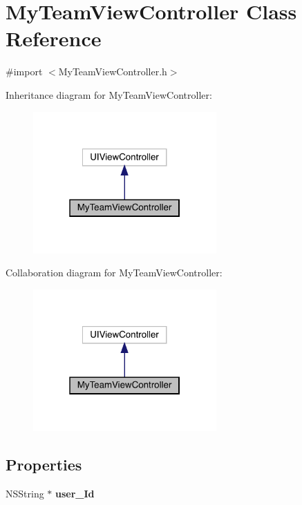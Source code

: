 \hypertarget{interface_my_team_view_controller}{}\section{My\+Team\+View\+Controller Class Reference}
\label{interface_my_team_view_controller}


{\ttfamily \#import $<$My\+Team\+View\+Controller.\+h$>$}



Inheritance diagram for My\+Team\+View\+Controller\+:\nopagebreak
\begin{figure}[H]
\begin{center}
\leavevmode
\includegraphics[width=199pt]{interface_my_team_view_controller__inherit__graph}
\end{center}
\end{figure}


Collaboration diagram for My\+Team\+View\+Controller\+:\nopagebreak
\begin{figure}[H]
\begin{center}
\leavevmode
\includegraphics[width=199pt]{interface_my_team_view_controller__coll__graph}
\end{center}
\end{figure}
\subsection*{Properties}
\begin{DoxyCompactItemize}
\item 
\mbox{\label{interface_my_team_view_controller_a8b781dea57e843165e5b93744570aa19}} 
N\+S\+String $\ast$ {\bfseries user\+\_\+\+Id}
\end{DoxyCompactItemize}


